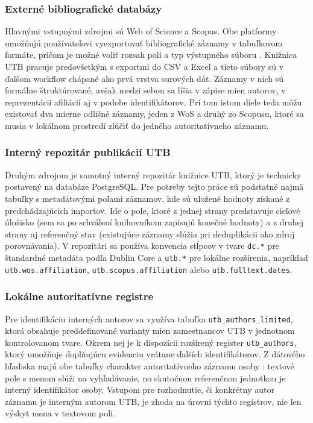 \subsubsection{Externé bibliografické databázy}

Hlavnými vstupnými zdrojmi sú Web of Science a Scopus. Obe platformy umožňujú používateľovi vyexportovať bibliografické záznamy v tabuľkovom formáte, pričom je možné voliť rozsah polí a typ výstupného súboru \cite{ClarivateWOSExport,ScopusSupport}. Knižnica UTB pracuje predovšetkým s exportmi do CSV a Excel a tieto súbory sú v ďalšom workflow chápané ako prvá vrstva surových dát. Záznamy v nich sú formálne štruktúrované, avšak medzi sebou sa líšia v zápise mien autorov, v reprezentácii afiliácií aj v podobe identifikátorov. Pri tom istom diele teda môžu existovať dva mierne odlišné záznamy, jeden z WoS a druhý zo Scopusu, ktoré sa musia v lokálnom prostredí zlúčiť do jedného autoritatívneho záznamu.

\subsubsection{Interný repozitár publikácií UTB}

Druhým zdrojom je samotný interný repozitár knižnice UTB, ktorý je technicky postavený na databáze PostgreSQL. Pre potreby tejto práce sú podstatné najmä tabuľky s metadátovými poľami záznamov, kde sú uložené hodnoty získané z predchádzajúcich importov. Ide o pole, ktoré z jednej strany predstavuje cieľové úložisko (sem sa po schválení knihovníkom zapisujú konečné hodnoty) a z druhej strany aj referenčný stav (existujúce záznamy slúžia pri deduplikácii ako zdroj porovnávania). V repozitári sa používa konvencia stĺpcov v tvare \texttt{dc.*} pre štandardné metadáta podľa Dublin Core a \texttt{utb.*} pre lokálne rozšírenia, napríklad \texttt{utb.wos.affiliation}, \texttt{utb.scopus.affiliation} alebo \texttt{utb.fulltext.dates}.

\subsubsection{Lokálne autoritatívne registre}

Pre identifikáciu interných autorov sa využíva tabuľka \texttt{utb\_authors\_limited}, ktorá obsahuje preddefinované varianty mien zamestnancov UTB v jednotnom kontrolovanom tvare. Okrem nej je k dispozícii rozšírený register \texttt{utb\_authors}, ktorý umožňuje doplňujúcu evidenciu vrátane ďalších identifikátorov. Z dátového hľadiska majú obe tabuľky charakter autoritatívneho záznamu osoby \cite{FRAD2013}: textové pole s menom slúži na vyhľadávanie, no skutočnou referenčnou jednotkou je interný identifikátor osoby. Vstupom pre rozhodnutie, či konkrétny autor záznamu je interným autorom UTB, je zhoda na úrovni týchto registrov, nie len výskyt mena v textovom poli.

